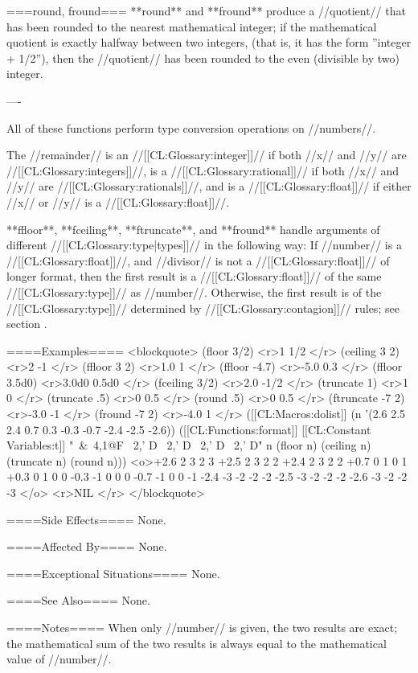===round, fround===
**round** and **fround** produce a //quotient// that has been rounded to the nearest mathematical integer; if the mathematical quotient is exactly halfway between two integers, (that is, it has the form ''integer + 1/2''), then the //quotient// has been rounded to the even (divisible by two) integer.

----

All of these functions perform type conversion operations on //numbers//.

The //remainder// is an //[[CL:Glossary:integer]]// if both //x// and //y// are //[[CL:Glossary:integers]]//, is a //[[CL:Glossary:rational]]// if both //x// and //y// are //[[CL:Glossary:rationals]]//, and is a //[[CL:Glossary:float]]// if either //x// or //y// is a //[[CL:Glossary:float]]//.

**ffloor**, **fceiling**, **ftruncate**, and **fround** handle arguments of different //[[CL:Glossary:type|types]]// in the following way: If //number// is a //[[CL:Glossary:float]]//, and //divisor// is not a //[[CL:Glossary:float]]// of longer format, then the first result is a //[[CL:Glossary:float]]// of the same //[[CL:Glossary:type]]// as //number//. Otherwise, the first result is of the //[[CL:Glossary:type]]// determined by //[[CL:Glossary:contagion]]// rules; see section {\secref\NumericContagionRules}.

====Examples====
<blockquote>
(floor 3/2) <r>1
1/2 </r>
(ceiling 3 2) <r>2
-1 </r>
(ffloor 3 2) <r>1.0
1 </r>
(ffloor -4.7) <r>-5.0
0.3 </r>
(ffloor 3.5d0) <r>3.0d0
0.5d0 </r>
(fceiling 3/2) <r>2.0
-1/2 </r>
(truncate 1) <r>1
0 </r>
(truncate .5) <r>0
0.5 </r>
(round .5) <r>0
0.5 </r>
(ftruncate -7 2) <r>-3.0
-1 </r>
(fround -7 2) <r>-4.0
1 </r>
([[CL:Macros:dolist]] (n '(2.6 2.5 2.4 0.7 0.3 -0.3 -0.7 -2.4 -2.5 -2.6)) 
  ([[CL:Functions:format]] [[CL:Constant Variables:t]] "~&~4,1@F ~2,' D ~2,' D ~2,' D ~2,' D" 
          n (floor n) (ceiling n) (truncate n) (round n)))
<o>+2.6  2  3  2  3
+2.5  2  3  2  2
+2.4  2  3  2  2
+0.7  0  1  0  1
+0.3  0  1  0  0
-0.3 -1  0  0  0
-0.7 -1  0  0 -1
-2.4 -3 -2 -2 -2
-2.5 -3 -2 -2 -2
-2.6 -3 -2 -2 -3 </o>
<r>NIL </r>
</blockquote>

====Side Effects====
None.

====Affected By====
None.

====Exceptional Situations====
None.

====See Also====
None.

====Notes====
When only //number// is given, the two results are exact; the mathematical sum of the two results is always equal to the mathematical value of //number//.

